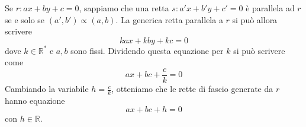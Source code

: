 \documentclass[a4paper]{article}
\begin{document}

Se \(r\colon ax+by+c=0\), sappiamo che una retta \(s\colon a'x + b'y + c'=0\) è parallela ad \(r\)
se e solo se \((a', b') \propto (a,b)\). La generica retta parallela a \(r\) si può allora scrivere
\[ kax + kby + kc = 0 \]
dove \(k \in {\mathbb{R}}^*\) e \(a,b\) sono fissi.
Dividendo questa equazione per \(k\) si può scrivere come
\[
    ax+bc+\frac{c}{k} = 0
\]
Cambiando la variabile \(h = \frac{c}{k}\), otteniamo che le rette di fascio generate da \(r\)
hanno equazione
\[
    ax+bc+h=0
\]
con \(h\in\mathbb{R}\).

\end{document}
